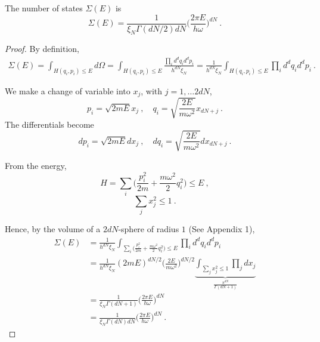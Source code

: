     The number of states $\Sigma(E)$ is 
    \begin{equation*}
        \Sigma(E) = \frac{1}{\xi_N \Gamma(dN/2) d N} \Big ( \frac{2 \pi E}{h \omega}\Big)^{dN} ~.
    \end{equation*}
    \begin{proof}
        By definition, 
        \begin{equation*}
        \begin{aligned}
            \Sigma (E) = \int_{H (q_i, p_i) \leq E} d\Omega = \int_{H (q_i, p_i) \leq E} \frac{\prod_i d^d q_i d^d p_i}{h^{dN} \xi_N} = \frac{1}{h^{dN} \xi_N} \int_{H (q_i, p_i) \leq E} \prod_i d^d q_i d^d p_i ~.
        \end{aligned}
        \end{equation*}

        We make a change of variable into $x_j$, with $j = 1, \ldots 2dN$,
        \begin{equation*}
            p_i = \sqrt{2mE} x_j ~, \quad q_i = \sqrt{\frac{2E}{m\omega^2}} x_{dN + j} ~.
        \end{equation*}
        The differentials become 
        \begin{equation*}
            d p_i = \sqrt{2mE} dx_j  ~, \quad d q_i = \sqrt{\frac{2E}{m\omega^2}} d x_{dN + j} ~.
        \end{equation*}

        From the energy,
        \begin{equation*}
            H = \sum_i \Big ( \frac{p^2_i}{2m} + \frac{m \omega^2}{2} q_i^2 \Big )  \leq E ~,
        \end{equation*}
        \begin{equation*}
            \sum_j x^2_j \leq 1 ~.
        \end{equation*}

        Hence, by the volume of a $2dN$-sphere of radius $1$ (See Appendix 1),
        \begin{equation*}
        \begin{aligned}
            \Sigma (E) & = \frac{1}{h^{dN} \xi_N} \int_{\sum_i \Big ( \frac{p^2_i}{2m} + \frac{m \omega^2}{2} q_i^2 \Big ) \leq E} \prod_i d^d q_i d^d p_i \\ & = \frac{1}{h^{dN} \xi_N} (2mE)^{dN/2} \Big (\frac{2E}{m\omega^2} \Big )^{dN/2} \underbrace{\int_{\sum_j x^2_j \leq 1} \prod_j d x_j}_{ \frac{\pi^{dN}}{\Gamma (dN + 1)}} \\ & = \frac{1}{\xi_N \Gamma (dN + 1)} \Big (\frac{2 \pi E}{h \omega} \Big )^{dN} \\ & = \frac{1}{\xi_N \Gamma (dN) dN} \Big (\frac{2 \pi E}{h \omega} \Big )^{dN} ~.
        \end{aligned}
        \end{equation*}
    \end{proof}

